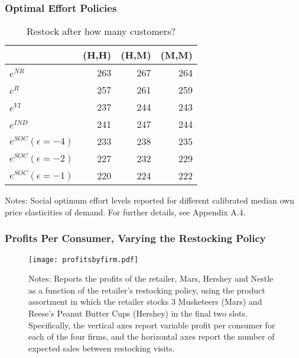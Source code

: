 \documentclass[aspectratio=169]{beamer}
\begin{document}
\begin{frame}
\frametitle{Optimal Effort Policies}
\begin{table}[htp]
\caption{Restock after how many customers?}
\begin{center}
\begin{tabular}{|l  r r r| }
\hline
 & (H,H) & (H,M) & (M,M) \\
\hline \hline
$e^{NR}$ & 263 & 267 & 264 \\
$e^{R}$ & 257 & 261 & 259 \\
$e^{VI}$ & 237 & 244 & 243 \\
$e^{IND}$ & 241 & 247 & 244 \\
$e^{SOC} (\epsilon=-4)$ & 233 & 238 & 235 \\
$e^{SOC} (\epsilon=-2)$ & 227 & 232 & 229 \\
$e^{SOC} (\epsilon=-1)$ & 220 & 224 & 222 \\
 \hline
 \end{tabular}
\end{center}
\footnotesize
Notes: Social optimum effort levels reported for different calibrated median own price elasticities of demand. For further details, see Appendix A.4.
\label{tab:policynew}
\end{table}

\end{frame}

\begin{frame}
\frametitle{Profits Per Consumer, Varying the Restocking Policy}
\begin{figure}[htbp]
\begin{center}
\vspace{-0.2in}
\texttt{[image: profitsbyfirm.pdf]}
\label{fig:profits}
\end{center}
\tiny
Notes: Reports the profits of the retailer, Mars, Hershey and Nestle as a function of the retailer's restocking policy, using the product assortment in which the retailer stocks 3 Musketeers (Mars) and Reese's Peanut Butter Cups (Hershey) in the final two slots. Specifically, the vertical axes report variable profit per consumer for each of the four firms, and the horizontal axes report the number of expected sales between restocking visits.
\end{figure}
\end{frame}
\end{document}
